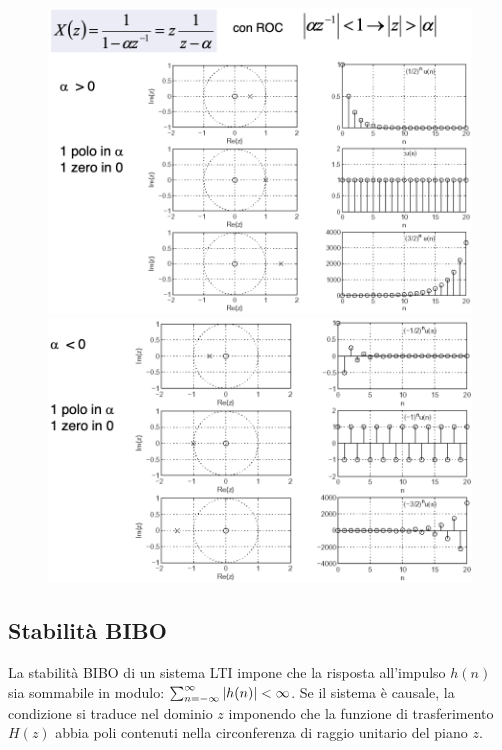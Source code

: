 \begin{figure}[p]
	\centering
	\includegraphics[scale=0.45]{Lezioni/Immagini/rocalpha1} \\
	\vspace{0.5cm}
	\hspace*{0.5cm} 
	\includegraphics[scale=0.43]{Lezioni/Immagini/rocalpha2}
\end{figure}

\newpage
\subsection{Stabilità BIBO}
La stabilità BIBO di un sistema LTI impone che la risposta all'impulso $h(n)$ sia sommabile in modulo: $\sum_{n=-\infty}^{\infty}\left|h(n)\right| < \infty$. Se il sistema è causale, la condizione si traduce nel dominio $z$ imponendo che la funzione di trasferimento $H(z)$ abbia poli contenuti nella circonferenza di raggio unitario del piano $z$. 

